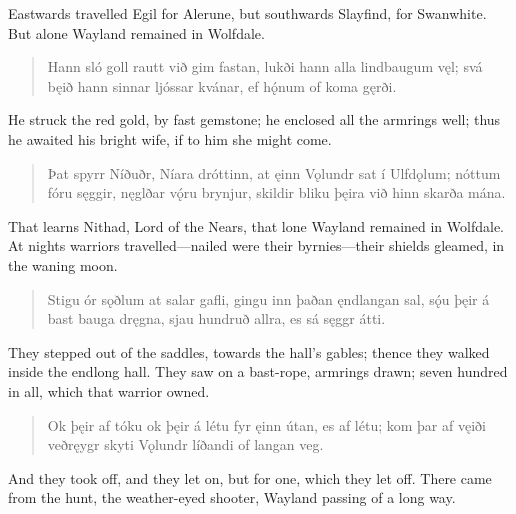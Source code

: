 \bvb Eastwards travelled Egil for Alerune, but southwards Slayfind, for Swanwhite. But alone Wayland remained in Wolfdale. \\

\begin{verse}
\bva Hann sló goll rautt \hld við gim fastan,
lukði hann alla \hld lindbaugum vęl;
svá bęið hann \hld sinnar ljóssar
kvánar, ef hǫ́num \hld of koma gęrði. \\%
\end{verse}

\bvb He struck the red gold, by fast gemstone; he enclosed all the armrings well; thus he awaited his bright wife, if to him she might come. \\

\begin{verse}
\bva Þat spyrr Níðuðr, \hld Níara dróttinn,
at ęinn Vǫlundr \hld sat í Ulfdǫlum;
nóttum fóru sęggir, \hld nęglðar vǫ́ru brynjur,
skildir bliku þęira \hld við hinn skarða mána. \\%
\end{verse}

\bvb That learns Nithad, Lord of the Nears, that lone Wayland remained in Wolfdale. At nights warriors travelled—nailed were their byrnies—their shields gleamed, in the waning moon. \\

\begin{verse}
\bva Stigu ór sǫðlum \hld at salar gafli,
gingu inn þaðan \hld ęndlangan sal,
sǫ́u þęir á bast \hld bauga dręgna,
sjau hundruð allra, \hld es sá sęggr átti. \\%
\end{verse}

\bvb They stepped out of the saddles, towards the hall's gables; thence they walked inside the endlong hall. They saw on a bast-rope, armrings drawn; seven hundred in all, which that warrior owned. \\

\begin{verse}
\bva Ok þęir af tóku \hld ok þęir á létu
fyr ęinn útan, \hld es af létu;
kom þar af vęiði \hld veðręygr skyti
Vǫlundr líðandi \hld of langan veg. \\%
\end{verse}

\bvb And they took off, and they let on, but for one, which they let off. There came from the hunt, the weather-eyed shooter, Wayland passing of a long way. \\

